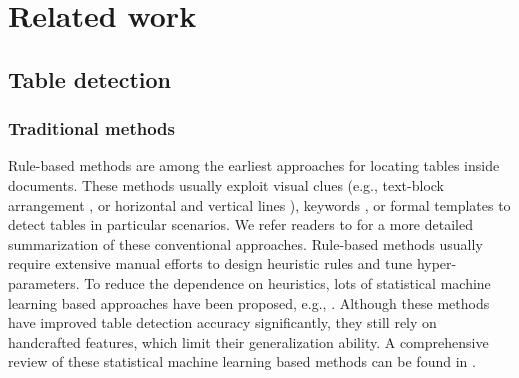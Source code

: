 \documentclass[final,3p,times,twocolumn]{elsarticle}
\begin{document}
{}

\section{Related work}
\label{sec:related_work}
\subsection{Table detection}
\label{subsec:TD}
\subsubsection{Traditional methods}
Rule-based methods are among the earliest approaches for locating tables inside documents. These methods usually exploit visual clues (e.g., text-block arrangement \cite{kieninger1998t}, or horizontal and vertical lines \cite{gatos2005automatic,hassan2007table,anh2015hybrid}), keywords \cite{tupaj1996extracting,harit2012table}, or formal templates \cite{wangt2001automatic} to detect tables in particular scenarios. We refer readers to \cite{zanibbi2004survey,embley2006table} for a more detailed summarization of these conventional approaches. Rule-based methods usually require extensive manual efforts to design heuristic rules and tune hyper-parameters. To reduce the dependence on heuristics, lots of statistical machine learning based approaches have been proposed, e.g., \cite{cesarini2002trainable,e2009learning}.
Although these methods have improved table detection accuracy significantly, they still rely on handcrafted features, which limit their generalization ability. A comprehensive review of these statistical machine learning based methods can be found in \cite{jorge2006design}.
\end{document}
